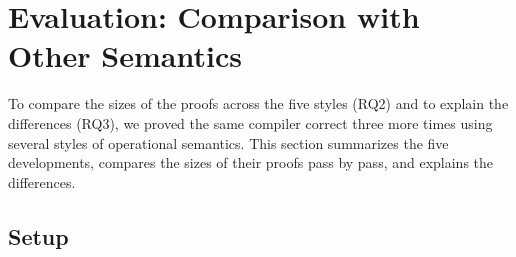 
\section{Evaluation: Comparison with Other Semantics}
\label{sec:evaluation}

To compare the sizes of the proofs across the five styles (RQ2) and
to explain the differences (RQ3), we proved the same
compiler correct three more times using several styles of operational
semantics. This section summarizes the five developments, compares the
sizes of their proofs pass by pass, and explains the differences.

\subsection{Setup}

